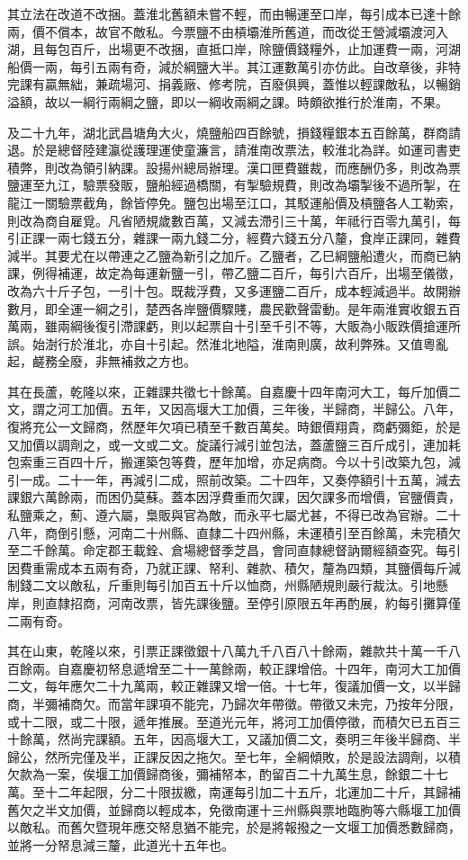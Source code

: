 \begin{pinyinscope}
其立法在改道不改捆。蓋淮北舊額未嘗不輕，而由暢運至口岸，每引成本已達十餘兩，價不償本，故官不敵私。今票鹽不由槓壩淮所舊道，而改從王營減壩渡河入湖，且每包百斤，出場更不改捆，直抵口岸，除鹽價錢糧外，止加運費一兩，河湖船價一兩，每引五兩有奇，減於綱鹽大半。其江運數萬引亦仿此。自改章後，非特完課有贏無絀，兼疏場河、捐義廠、修考院，百廢俱興，蓋惟以輕課敵私，以暢銷溢額，故以一綱行兩綱之鹽，即以一綱收兩綱之課。時頗欲推行於淮南，不果。

及二十九年，湖北武昌塘角大火，燒鹽船四百餘號，損錢糧銀本五百餘萬，群商請退。於是總督陸建瀛從護理運使童濂言，請淮南改票法，較淮北為詳。如運司書吏積弊，則改為領引納課。設揚州總局辦理。漢口匣費雖裁，而應酬仍多，則改為票鹽運至九江，驗票發販，鹽船經過橋關，有掣驗規費，則改為壩掣後不過所掣，在龍江一關驗票截角，餘皆停免。鹽包出場至江口，其駁運船價及槓鹽各人工勒索，則改為商自雇覓。凡省陋規歲數百萬，又減去滯引三十萬，年祗行百零九萬引，每引正課一兩七錢五分，雜課一兩九錢二分，經費六錢五分八釐，食岸正課同，雜費減半。其要尤在以帶連之乙鹽為新引之加斤。乙鹽者，乙巳綱鹽船遭火，而商已納課，例得補運，故定為每運新鹽一引，帶乙鹽二百斤，每引六百斤，出場至儀徵，改為六十斤子包，一引十包。既裁浮費，又多運鹽二百斤，成本輕減過半。故開辦數月，即全運一綱之引，楚西各岸鹽價驟賤，農民歡聲雷動。是年兩淮實收銀五百萬兩，雖兩綱後復引滯課虧，則以起票自十引至千引不等，大販為小販跌價搶運所誤。始澍行於淮北，亦自十引起。然淮北地隘，淮南則廣，故利弊殊。又值粵亂起，鹺務全廢，非無補救之方也。

其在長蘆，乾隆以來，正雜課共徵七十餘萬。自嘉慶十四年南河大工，每斤加價二文，謂之河工加價。五年，又因高堰大工加價，三年後，半歸商，半歸公。八年，復將充公一文歸商，然歷年欠項已積至千數百萬矣。時銀價翔貴，商虧彌鉅，於是又加價以調劑之，或一文或二文。旋議行減引並包法，蓋蘆鹽三百斤成引，連加耗包索重三百四十斤，搬運築包等費，歷年加增，亦足病商。今以十引改築九包，減引一成。二十一年，再減引二成，照前改築。二十四年，又奏停額引十五萬，減去課銀六萬餘兩，而困仍莫蘇。蓋本因浮費重而欠課，因欠課多而增價，官鹽價貴，私鹽乘之，薊、遵六屬，梟販與官為敵，而永平七屬尤甚，不得已改為官辦。二十八年，商倒引懸，河南二十州縣、直隸二十四州縣，未運積引至百餘萬，未完積欠至二千餘萬。命定郡王載銓、倉場總督季芝昌，會同直隸總督訥爾經額查究。每引因費重需成本五兩有奇，乃就正課、帑利、雜款、積欠，釐為四類，其鹽價每斤減制錢二文以敵私，斤重則每引加百五十斤以恤商，州縣陋規則嚴行裁汰。引地懸岸，則直隸招商，河南改票，皆先課後鹽。至停引原限五年再酌展，約每引攤算僅二兩有奇。

其在山東，乾隆以來，引票正課徵銀十八萬九千八百八十餘兩，雜款共十萬一千八百餘兩。自嘉慶初帑息遞增至二十一萬餘兩，較正課增倍。十四年，南河大工加價二文，每年應欠二十九萬兩，較正雜課又增一倍。十七年，復議加價一文，以半歸商，半彌補商欠。而當年課項不能完，乃歸次年帶徵。帶徵又未完，乃按年分限，或十二限，或二十限，遞年推展。至道光元年，將河工加價停徵，而積欠已五百三十餘萬，然尚完課額。五年，因高堰大工，又議加價二文，奏明三年後半歸商、半歸公，然所完僅及半，正課反因之拖欠。至七年，全綱傾敗，於是設法調劑，以積欠款為一案，俟堰工加價歸商後，彌補帑本，酌留百二十九萬生息，餘銀二十七萬。至十二年起限，分二十限拔繳，南運每引加二十五斤，北運加二十斤，其歸補舊欠之半文加價，並歸商以輕成本，免徵南運十三州縣與票地臨朐等六縣堰工加價以敵私。而舊欠暨現年應交帑息猶不能完，於是將報撥之一文堰工加價悉數歸商，並將一分帑息減三釐，此道光十五年也。


\end{pinyinscope}
